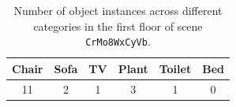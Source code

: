 \begin{table}[tb]
  \centering
  \small
  \vspace{6pt}
  \begin{tabular}{@{}c c c c c c@{}}
    \toprule
    Chair & Sofa & TV & Plant & Toilet & Bed \\
    \midrule
    11 & 2 & 1 & 3 & 1 & 0 \\
    \bottomrule
  \end{tabular}
  \vspace{5pt}
  \caption{Number of object instances across different categories in the first floor of scene \texttt{CrMo8WxCyVb}.} 
  \vspace{-24pt}
  \label{tab:time}
\end{table}